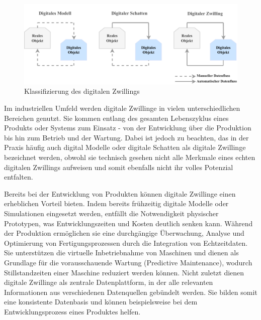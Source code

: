 
\begin{figure}[htbp]
    \centering
    \includegraphics[width=1\textwidth]{Bilder/klassifizierung_DT.pdf}
    \caption{Klassifizierung des digitalen Zwillings}
    \label{fig:klassifizierungDT}
\end{figure}

Im industriellen Umfeld werden digitale Zwillinge in vielen unterschiedlichen Bereichen genutzt.
Sie kommen entlang des gesamten Lebenszyklus eines Produkts oder Systems zum Einsatz - von der Entwicklung über die Produktion bis hin zum Betrieb und der Wartung. 
Dabei ist jedoch zu beachten, das in der Praxis häufig auch digital Modelle oder digitale Schatten als digitale Zwillinge bezeichnet werden, obwohl sie technisch gesehen nicht alle Merkmale eines echten digitalen Zwillings aufweisen und somit ebenfalls nicht ihr volles Potenzial entfalten.

Bereits bei der Entwicklung von Produkten können digitale Zwillinge einen erheblichen Vorteil bieten. 
Indem bereits frühzeitig digitale Modelle oder Simulationen eingesetzt werden, entfällt die Notwendigkeit physischer Prototypen, was Entwicklungszeiten und Kosten deutlich senken kann. Während der Produktion ermöglichen sie eine durchgängige Überwachung, Analyse und Optimierung von Fertigungsprozessen durch die Integration von Echtzeitdaten.
Sie unterstützen die virtuelle Inbetriebnahme von Maschinen und dienen als Grundlage für die vorausschauende Wartung (Predictive Maintenance), wodurch Stillstandzeiten einer Maschine reduziert werden können.
Nicht zuletzt dienen digitale Zwillinge als zentrale Datenplattform, in der alle relevanten Informationen aus verschiedenen Datenquellen gebündelt werden.
Sie bilden somit eine konsistente Datenbasis und können beispielsweise bei dem Entwicklungsprozess eines Produktes helfen. \cite{DTForSmartManufacturing}

